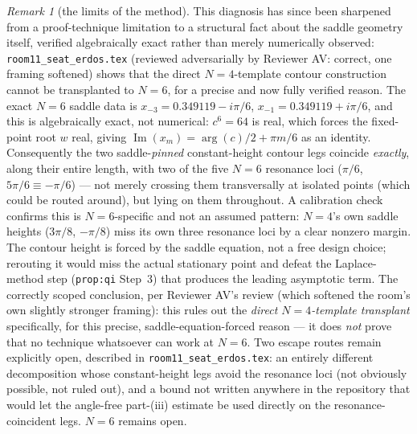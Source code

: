 \documentclass[11pt]{article}
\theoremstyle{plain}
\theoremstyle{definition}
\theoremstyle{remark}
\newtheorem{remark}[theorem]{Remark}
\theoremstyle{plain}\newtheorem*{maintheorem}{Main Theorem}
\begin{document}
\begin{remark}[the limits of the method]
This diagnosis has since been sharpened from a proof-technique limitation to a structural fact about
the saddle geometry itself, verified algebraically exact rather than merely numerically observed:
\texttt{room11\_seat\_erdos.tex} (reviewed adversarially by Reviewer AV: correct, one framing softened)
shows that the direct $N=4$-template contour construction cannot be transplanted to $N=6$, for a
precise and now fully verified reason. The exact $N=6$ saddle data is $x_{-3}=0.349119-i\pi/6$,
$x_{-1}=0.349119+i\pi/6$, and this is algebraically exact, not numerical: $c^6=64$ is real, which
forces the fixed-point root $w$ real, giving $\operatorname{Im}(x_m)=\arg(c)/2+\pi m/6$ as an identity.
Consequently the two saddle-\emph{pinned} constant-height contour legs coincide \emph{exactly}, along
their entire length, with two of the five $N=6$ resonance loci ($\pi/6$, $5\pi/6\equiv-\pi/6$) — not
merely crossing them transversally at isolated points (which could be routed around), but lying on
them throughout. A calibration check confirms this is $N=6$-specific and not an assumed pattern: $N=4$'s
own saddle heights ($3\pi/8$, $-\pi/8$) miss its own three resonance loci by a clear nonzero margin.
The contour height is forced by the saddle equation, not a free design choice; rerouting it would miss
the actual stationary point and defeat the Laplace-method step (\texttt{prop:qi} Step~3) that produces
the leading asymptotic term. The correctly scoped conclusion, per Reviewer AV's review (which softened
the room's own slightly stronger framing): this rules out the \emph{direct $N=4$-template transplant}
specifically, for this precise, saddle-equation-forced reason — it does \emph{not} prove that no
technique whatsoever can work at $N=6$. Two escape routes remain explicitly open, described in
\texttt{room11\_seat\_erdos.tex}: an entirely different decomposition whose constant-height legs avoid
the resonance loci (not obviously possible, not ruled out), and a bound not written anywhere in the
repository that would let the angle-free part-(iii) estimate be used directly on the resonance-coincident
legs. $N=6$ remains open.
\end{remark}
\end{document}

